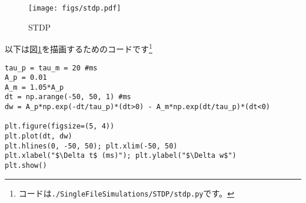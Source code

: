 \begin{figure}[htbp]
    \centering
    \texttt{[image: figs/stdp.pdf]}
    \caption{STDP}
    \label{fig:stdp}
\end{figure}
以下は図\ref{fig:stdp}を描画するためのコードです\footnote{コードは\texttt{./SingleFileSimulations/STDP/stdp.py}です。}
\begin{verbatim}
tau_p = tau_m = 20 #ms
A_p = 0.01
A_m = 1.05*A_p
dt = np.arange(-50, 50, 1) #ms
dw = A_p*np.exp(-dt/tau_p)*(dt>0) - A_m*np.exp(dt/tau_p)*(dt<0) 

plt.figure(figsize=(5, 4))
plt.plot(dt, dw)
plt.hlines(0, -50, 50); plt.xlim(-50, 50)
plt.xlabel("$\Delta t$ (ms)"); plt.ylabel("$\Delta w$")
plt.show()
\end{verbatim}

